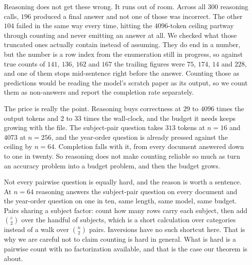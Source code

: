 \documentclass[10pt]{article}
\theoremstyle{definition}
\begin{document}
Reasoning does not get these wrong. It runs out of room. Across all $300$
reasoning calls, $196$ produced a final answer and not one of those was
incorrect. The other $104$ failed in the same way every time, hitting the
$4096$-token ceiling partway through counting and never emitting an answer
at all. We checked what those truncated ones actually contain instead of
assuming. They do end in a number, but the number is a row index from the
enumeration still in progress, so against true counts of $141$, $136$,
$162$ and $167$ the trailing figures were $75$, $174$, $14$ and $228$, and
one of them stops mid-sentence right before the answer. Counting those as
predictions would be reading the model's scratch paper as its output, so we count them as non-answers and report the completion rate separately.

The price is really the point. Reasoning buys correctness at $29$ to
$4096$ times the output tokens and $2$ to $33$ times the wall-clock, and
the budget it needs keeps growing with the file. The subject-pair question
takes $313$ tokens at $n = 16$ and $4073$ at $n = 256$, and the year-order
question is already pressed against the ceiling by $n = 64$. Completion
falls with it, from every document answered down to one in twenty. So
reasoning does not make counting reliable so much as turn an accuracy
problem into a budget problem, and then the budget grows.

Not every pairwise question is equally hard, and the reason is worth a
sentence. At $n = 64$ reasoning answers the subject-pair question on every
document and the year-order question on one in ten, same length, same
model, same budget. Pairs sharing a subject factor: count how many rows
carry each subject, then add $\binom{c}{2}$ over the handful of subjects,
which is a short calculation over categories instead of a walk over
$\binom{n}{2}$ pairs. Inversions have no such shortcut here. That is why we are
careful not to claim counting is hard in general. What is hard is a
pairwise count with no factorization available, and that is the case our
theorem is about.
\end{document}
